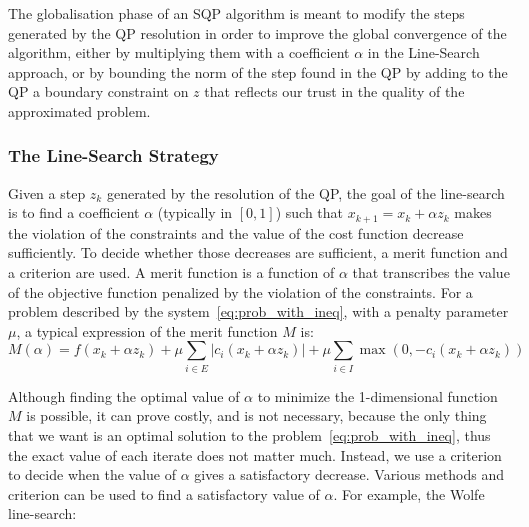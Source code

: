 The globalisation phase of an SQP algorithm is meant to modify the steps generated by the QP resolution in order to improve the global convergence of the algorithm, either by multiplying them with a coefficient $\alpha$ in the Line-Search approach, or by bounding the norm of the step found in the QP by adding to the QP a boundary constraint on $z$ that reflects our trust in the quality of the approximated problem.

\subsubsection{The Line-Search Strategy}
\label{ssub:line_search}

Given a step $z_k$ generated by the resolution of the QP, the goal of the line-search is to find a coefficient $\alpha$ (typically in $[0,1]$) such that $x_{k+1}=x_k + \alpha z_k$ makes the violation of the constraints and the value of the cost function decrease sufficiently.
To decide whether those decreases are sufficient, a merit function and a criterion are used.
A merit function is a function of $\alpha$ that transcribes the value of the objective function penalized by the violation of the constraints.
For a problem described by the system~\ref{eq:prob_with_ineq}, with a penalty parameter $\mu$, a typical expression of the merit function $M$ is:
\begin{equation}
  M(\alpha) = f(x_k +\alpha z_k) + \mu \sum_{i\in E} \left| c_i(x_k+\alpha z_k) \right| + \mu \sum_{i\in I} \max \left(0,-c_i(x_k + \alpha z_k)\right)
\end{equation}

Although finding the optimal value of $\alpha$ to minimize the 1-dimensional function $M$ is possible, it can prove costly, and is not necessary, because the only thing that we want is an optimal solution to the problem~\ref{eq:prob_with_ineq}, thus the exact value of each iterate does not matter much.
Instead, we use a criterion to decide when the value of $\alpha$ gives a satisfactory decrease.
Various methods and criterion can be used to find a satisfactory value of $\alpha$.
For example, the Wolfe line-search:




